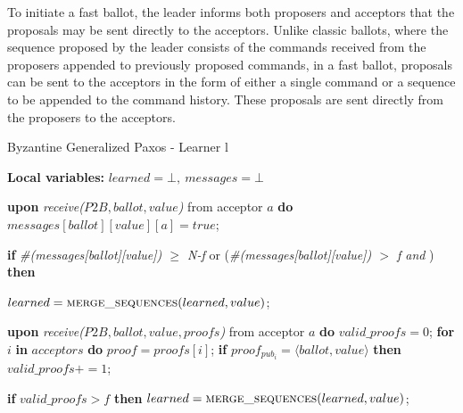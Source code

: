 To initiate a fast ballot, the leader informs both proposers and acceptors that the proposals may be sent directly to the acceptors. Unlike classic ballots, where the sequence proposed by the leader consists of the commands received from the proposers appended to previously proposed commands, in a fast ballot, proposals can be sent to the acceptors in the form of either a single command or a sequence to be appended to the command history. These proposals are sent directly from the proposers to the acceptors.\par
	\vspace*{-.4cm}
\begin{algorithm}
	\caption{Byzantine Generalized Paxos - Learner l}
	\label{BFT-Learn}
	\textbf{Local variables:} $learned = \bot,\ messages = \bot$ 
	\vspace*{-.5cm}
	\begin{multicols}{2}
		\begin{algorithmic}[1]
			\State \textbf{upon} \textit{receive($P2B, ballot, value$)} from acceptor $a$ \textbf{do}
			\State \hspace{\algorithmicindent} $messages[ballot][value][a] = true$;
			\State \hspace{\algorithmicindent} \parbox{\linewidth}{\textbf{if} \textit{\#(messages[ballot][value]) $\geq$ N-f} or (\textit{\#(messages[ballot][value]) $>$ f and }) \textbf{then}}
			\State \hspace{\algorithmicindent}\hspace{\algorithmicindent} $learned = \Call{merge\_sequences}{learned, value}$;
			
			\State
			\State \textbf{upon} \textit{receive($P2B, ballot, value, proofs$)} from acceptor $a$ \textbf{do}
			\State \hspace{\algorithmicindent} $valid\_proofs = 0$;
			\State \hspace{\algorithmicindent} \textbf{for} $i$ \textbf{in} $acceptors$ \textbf{do}
			\State \hspace{\algorithmicindent}\hspace{\algorithmicindent} $proof = proofs[i]$;
			\State \hspace{\algorithmicindent}\hspace{\algorithmicindent} \textbf{if} $proof_{pub_i} = \langle ballot, value \rangle$ \textbf{then}
			\State \hspace{\algorithmicindent}\hspace{\algorithmicindent}\hspace{\algorithmicindent} 
			$valid\_proofs \mathrel{+{=}} 1$;

			\State \hspace{\algorithmicindent} \textbf{if} $valid\_proofs > f$ \textbf{then}
			\State \hspace{\algorithmicindent}\hspace{\algorithmicindent} $learned = \Call{merge\_sequences}{learned, value}$;
		\end{algorithmic}
	\end{multicols}
	\vspace*{-.4cm}
\end{algorithm}
